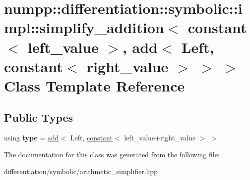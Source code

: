 \hypertarget{classnumpp_1_1differentiation_1_1symbolic_1_1impl_1_1simplify__addition_3_01constant_3_01left__v2b04d4fb76b2adc8e73af8cc3aa482e4}{}\section{numpp\+:\+:differentiation\+:\+:symbolic\+:\+:impl\+:\+:simplify\+\_\+addition$<$ constant$<$ left\+\_\+value $>$, add$<$ Left, constant$<$ right\+\_\+value $>$ $>$ $>$ Class Template Reference}
\label{classnumpp_1_1differentiation_1_1symbolic_1_1impl_1_1simplify__addition_3_01constant_3_01left__v2b04d4fb76b2adc8e73af8cc3aa482e4}
\subsection*{Public Types}
\begin{DoxyCompactItemize}
\item 
\mbox{\label{classnumpp_1_1differentiation_1_1symbolic_1_1impl_1_1simplify__addition_3_01constant_3_01left__v2b04d4fb76b2adc8e73af8cc3aa482e4_ae19e40abfa26bc49e73fc2efa69d6b99}} 
using {\bfseries type} = \hyperlink{classnumpp_1_1differentiation_1_1symbolic_1_1add}{add}$<$ Left, \hyperlink{classnumpp_1_1differentiation_1_1symbolic_1_1constant}{constant}$<$ left\+\_\+value+right\+\_\+value $>$ $>$
\end{DoxyCompactItemize}


The documentation for this class was generated from the following file\+:\begin{DoxyCompactItemize}
\item 
differentiation/symbolic/arithmetic\+\_\+simplifier.\+hpp\end{DoxyCompactItemize}
